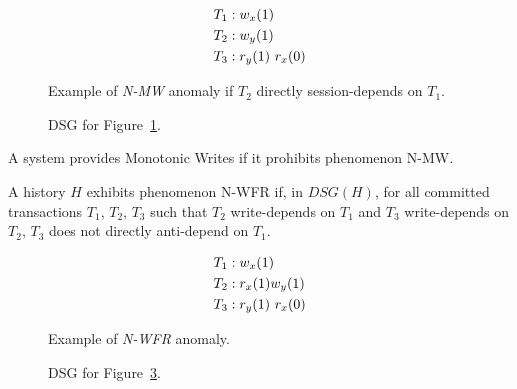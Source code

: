 \begin{figure}[H]
\begin{align*}
\small
T_1 &: w_x(1)\\
T_2 &: w_y(1)\\
T_3 &: r_y(1)~r_x(0)
\end{align*}
\caption{Example of \textit{N-MW} anomaly if $T_2$ directly session-depends on $T_1$.}
\label{fig:nmw-history}
\end{figure}

\begin{figure}[H]
\centering
{}
\caption{DSG for Figure~\ref{fig:nmw-history}.}
\label{fig:nmw-dsg}
\end{figure}


\begin{definition}
A system provides Monotonic Writes if it prohibits phenomenon N-MW.
\end{definition}

\begin{definition}
A history $H$ exhibits phenomenon N-WFR if, in $DSG(H)$, for all
committed transactions $T_1$, $T_2$, $T_3$ such that $T_2$
write-depends on $T_1$ and $T_3$ write-depends on $T_2$, $T_3$ does
not directly anti-depend on $T_1$.
\end{definition}


\begin{figure}[H]
\begin{align*}
\small
T_1 &: w_x(1)\\
T_2 &: r_x(1) w_y(1)\\
T_3 &: r_y(1)~r_x(0)
\end{align*}
\caption{Example of \textit{N-WFR} anomaly.}
\label{fig:nwfr-history}
\end{figure}

\begin{figure}[H]
\centering
{}
\caption{DSG for Figure~\ref{fig:nwfr-history}.}
\label{fig:nwfr-dsg}
\end{figure}

